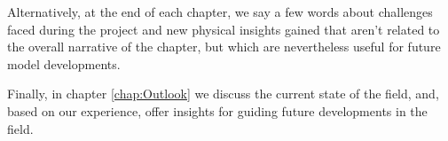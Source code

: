 Alternatively, at the end of each chapter, we say a few words about challenges faced during the project and new physical insights gained that aren't related to the overall narrative of the chapter, but which are nevertheless useful for future model developments.

Finally, in chapter \ref{chap:Outlook} we discuss the current state of the field, and, based on our experience, offer insights for guiding future developments in the field.
